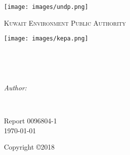 \documentclass[
12pt, %
oneside, %
english, %
singlespacing, %
nolistspacing, %
liststotoc, %
parskip, %
headsepline, %
chapterinoneline, %
]{MastersDoctoralThesis} %
\author{Brian Freeman, PE} %
\begin{document}
\frontmatter %

\pagestyle{plain} %


\begin{titlepage}
\begin{center}

\vspace*{.02\textheight}
{\scshape\LARGE \univname\par} %
\begin{center}
\texttt{[image: images/undp.png]} %
\end{center}
\textsc{\LARGE Kuwait Environment Public Authority}\\[0.5cm] 
\begin{center}
\texttt{[image: images/kepa.png]} %
\end{center}
\HRule \\[0.4cm] %
{\huge \bfseries \ttitle\par}\vspace{0.4cm} %
\HRule \\[1.5cm] %
\begin{minipage}[t]{0.4\textwidth}
\begin{flushleft} \large
\emph{Author:}\\
{\authorname} %
\end{flushleft}
\end{minipage}
\begin{minipage}[t]{0.4\textwidth}
\begin{flushright} \large

\end{flushright}
\end{minipage}\\[1cm]
 
\vfill

 Report 0096804-1 \\
 
\vfill
{\large \today}\\[2cm] %
\vfill
\end{center}
Copyright \copyright 2018
\end{titlepage}
\end{document}
